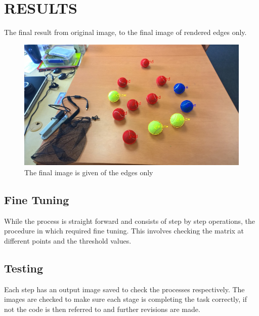 \documentclass[a4paper, 10pt]{article}
\begin{document}
\clearpage

\section{RESULTS}

The final result from original image, to the final image of rendered edges only.

\begin{figure}[H]
  \includegraphics[width=\linewidth]{images/Final}
  \caption{The final image is given of the edges only}
  \label{fig:The final image is given of the edges only}
\end{figure}



\subsection{Fine Tuning} 
While the process is straight forward and consists of step by step operations, the procedure in which required fine tuning. This involves checking the matrix at different points and the threshold values.


\subsection{Testing}
Each step has an output image saved to check the processes respectively. The images are checked to make sure each stage is completing the task correctly, if not the code is then referred to and further revisions are made.
\end{document}
